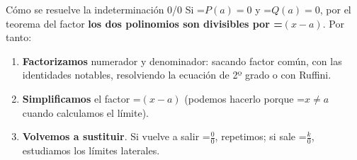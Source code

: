 \documentclass[11pt,a4paper]{article}
\newcommand{\fmm}[1]{\setbox0=\hbox{$#1$}\ifdim\wd0>\linewidth\[#1\]\else\mbox{\box0}\fi}
\begin{document}
  

  
\begin{fmdef}{Cómo se resuelve la indeterminación 0/0}
Si \fmm{P(a)=0} y \fmm{Q(a)=0}, por el teorema del factor \textbf{los dos polinomios son divisibles por \fmm{(x-a)}}. Por tanto:

      
\begin{enumerate}
\item \textbf{Factorizamos} numerador y denominador: sacando factor común, con las identidades notables, resolviendo la ecuación de 2º grado o con Ruffini.
\item \textbf{Simplificamos} el factor \fmm{(x-a)} (podemos hacerlo porque \fmm{x\neq a} cuando calculamos el límite).
\item \textbf{Volvemos a sustituir}. Si vuelve a salir \fmm{\frac00}, repetimos; si sale \fmm{\frac{k}{0}}, estudiamos los límites laterales.
\end{enumerate}
\end{fmdef}
\end{document}
